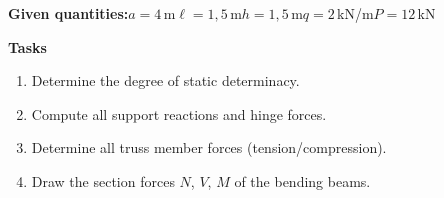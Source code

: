 \documentclass[a4paper,11pt]{article}
\begin{document}
\textbf{Given quantities:}\quad $a=4$\,m\quad $\ell=1,5$\,m\quad $h=1,5$\,m\quad $q=2$\,kN/m\quad $P=12$\,kN
\par\medskip
\textbf{Tasks}\par
\begin{enumerate}[label=\textbf{\arabic*.}]
  \item Determine the degree of static determinacy.
  \item Compute all support reactions and hinge forces.
  \item Determine all truss member forces (tension/compression).
  \item Draw the section forces $N$, $V$, $M$ of the bending beams.
\end{enumerate}
\end{document}
